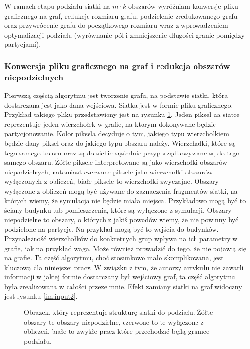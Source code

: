 W ramach etapu podziału siatki na $m \cdot k$ obszarów wyróżniam konwersje pliku graficznego na graf, redukcje rozmiaru grafu,
podzielenie zredukowanego grafu oraz przywrócenie grafu do początkowego rozmiaru wraz z wprowadzeniem optymalizacji podziału
(wyrównanie pól i zmniejszenie długości granic pomiędzy partycjami).

\subsubsection{Konwersja pliku graficznego na graf i redukcja obszarów niepodzielnych}

Pierwszą częścią algorytmu jest tworzenie grafu, na podstawie siatki, która dostarczana jest jako dana wejściowa.
Siatka jest w formie pliku graficznego.
Przykład takiego pliku przedstawiony jest na rysunku \ref{im:input}.
Jeden piksel na siatce reprezentuje jeden wierzchołek w grafie, na którym dokonywane będzie partycjonowanie.
Kolor piksela decyduje o tym, jakiego typu wierzchołkiem będzie dany piksel oraz do jakiego typu obszaru należy.
Wierzchołki, które są tego samego koloru oraz są do siebie sąsiednie przyporządkowywane są do tego samego obszaru.
Żółte piksele interpretowane są jako wierzchołki obszarów niepodzielnych, natomiast czerwone piksele
jako wierzchołki obszarów wyłączonych z obliczeń, białe piksele to wierzchołki zwyczajne.
Obszary wyłączone z obliczeń mogą być używane do zaznaczenia fragmentów siatki, na których wiemy, że symulacja
nie będzie miała miejsca.
Przykładowo mogą być to ściany budynku lub pomieszczenia, które są wyłączone z symulacji.
Obszary niepodzielne to obszary, o których z jakiś powodów wiemy, że nie powinny być podzielone na partycje.
Na przykład mogą być to wejścia do budynków.
Przynależność wierzchołków do konkretnych grup wpływa na ich parametry w grafie, jak na przykład waga.
Może również prowadzić do tego, że nie pojawią się na grafie.
Ta część algorytmu, choć stosunkowo mało skomplikowana, jest kluczową dla niniejszej pracy.
W związku z tym, że autorzy artykułu \cite{1364754} nie zawarli informacji w jakiej formie dostarczany był
wejściowy graf, ta część algorytmu była zrealizowana w całości przeze mnie.
Efekt zamiany siatki na graf widoczny jest rysunku \ref{im:input2}.

\begin{figure}[h]
    \centering
    \caption{Obrazek, który reprezentuje strukturę siatki do podziału. Żółte obszary to obszary niepodzielne, czerwone to
    te wyłączone z obliczeń, białe to zwykłe przez które przechodzić będą granice podziału.}
    \label{im:input}
\end{figure}

